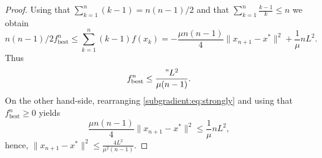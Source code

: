 \begin{proof}
    Using that $\sum_{k=1}^{n} (k-1) = n(n-1)/2$ and that $\sum_{k=1}^{n}\frac{k-1}{k}\leq n$ we obtain
    \begin{equation}\label{subgradient:eq:strongly}
        n(n-1)/2 f^n_{\mathrm{best}}\leq \sum_{k=1}^{n} (k-1)f(x_k) = -\frac{\mu n(n-1)}{4} \|x_{n+1}-x^*\|^2 + \frac{1}{\mu} n L^2.
    \end{equation}
    Thus
    \begin{equation}
        f^n_{\mathrm{best}} \leq \frac{"L^2}{\mu(n-1)}.
    \end{equation}
    On the other hand-side, rearranging \eqref{subgradient:eq:strongly} and using that $f^n_{\mathrm{best}}\geq 0$ yields
    \begin{equation}
        \frac{\mu n(n-1)}{4} \|x_{n+1}-x^*\|^2 \leq \frac{1}{\mu} n L^2,
    \end{equation}
    hence, $\|x_{n+1}-x^*\|^2\leq \frac{4L^2}{\mu^2 (n-1)}$.
\end{proof}

